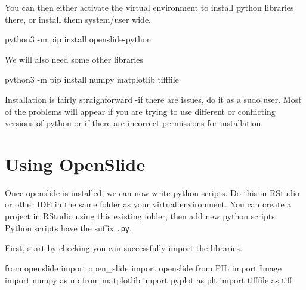 \documentclass[
]{book}
\newenvironment{Shaded}{\begin{snugshade}}{\end{snugshade}}
\newcommand{\AttributeTok}[1]{\textcolor[rgb]{0.77,0.63,0.00}{#1}}
\newcommand{\ExtensionTok}[1]{#1}
\newcommand{\ImportTok}[1]{#1}
\newcommand{\NormalTok}[1]{#1}
\begin{document}
You can then either activate the virtual environment to install python libraries there, or install them system/user wide.

\begin{Shaded}
\begin{Highlighting}[]
\ExtensionTok{python3} \AttributeTok{{-}m}\NormalTok{ pip install openslide{-}python}
\end{Highlighting}
\end{Shaded}

We will also need some other libraries

\begin{Shaded}
\begin{Highlighting}[]
\ExtensionTok{python3} \AttributeTok{{-}m}\NormalTok{ pip install numpy matplotlib tifffile}
\end{Highlighting}
\end{Shaded}

Installation is fairly straighforward -if there are issues, do it as a sudo user. Most of the problems will appear if you are trying to use different or conflicting versions of python or if there are incorrect permissions for installation.

\hypertarget{using-openslide}{%
\section{Using OpenSlide}\label{using-openslide}}

Once openslide is installed, we can now write python scripts. Do this in RStudio or other IDE in the same folder as your virtual environment. You can create a project in RStudio using this existing folder, then add new python scripts. Python scripts have the suffix \texttt{.py}.

First, start by checking you can successfully import the libraries.

\begin{Shaded}
\begin{Highlighting}[]
\ImportTok{from}\NormalTok{ openslide }\ImportTok{import}\NormalTok{ open\_slide}
\ImportTok{import}\NormalTok{ openslide}
\ImportTok{from}\NormalTok{ PIL }\ImportTok{import}\NormalTok{ Image}
\ImportTok{import}\NormalTok{ numpy }\ImportTok{as}\NormalTok{ np}
\ImportTok{from}\NormalTok{ matplotlib }\ImportTok{import}\NormalTok{ pyplot }\ImportTok{as}\NormalTok{ plt}
\ImportTok{import}\NormalTok{ tifffile }\ImportTok{as}\NormalTok{ tiff}
\end{Highlighting}
\end{Shaded}
\end{document}
